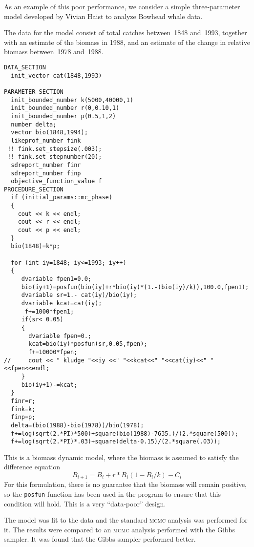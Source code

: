 \documentclass{admbmanual}
\begin{document}
As an example of this poor performance, we consider a simple three-parameter
model developed by Vivian Haist to analyze Bowhead whale data.

The data for the model consist of total catches between~1848 and~1993, together
with an estimate of the biomass in 1988, and an estimate of the change in
relative biomass between~1978 and~1988.

\begin{lstlisting}
DATA_SECTION
  init_vector cat(1848,1993)

PARAMETER_SECTION
  init_bounded_number k(5000,40000,1)
  init_bounded_number r(0,0.10,1)
  init_bounded_number p(0.5,1,2)
  number delta;
  vector bio(1848,1994);
  likeprof_number fink
 !! fink.set_stepsize(.003);
 !! fink.set_stepnumber(20);
  sdreport_number finr
  sdreport_number finp
  objective_function_value f
PROCEDURE_SECTION
  if (initial_params::mc_phase)
  {
    cout << k << endl;
    cout << r << endl;
    cout << p << endl;
  }
  bio(1848)=k*p;

  for (int iy=1848; iy<=1993; iy++)
  {
     dvariable fpen1=0.0;
     bio(iy+1)=posfun(bio(iy)+r*bio(iy)*(1.-(bio(iy)/k)),100.0,fpen1);
     dvariable sr=1.- cat(iy)/bio(iy);
     dvariable kcat=cat(iy);
      f+=1000*fpen1;
     if(sr< 0.05)
     {
       dvariable fpen=0.;
       kcat=bio(iy)*posfun(sr,0.05,fpen);
       f+=10000*fpen;
//     cout << " kludge "<<iy <<" "<<kcat<<" "<<cat(iy)<<" "<<fpen<<endl;
     }
     bio(iy+1)-=kcat;
  }
  finr=r;
  fink=k;
  finp=p;
  delta=(bio(1988)-bio(1978))/bio(1978);
  f+=log(sqrt(2.*PI)*500)+square(bio(1988)-7635.)/(2.*square(500));
  f+=log(sqrt(2.*PI)*.03)+square(delta-0.15)/(2.*square(.03));
\end{lstlisting}
This is a biomass dynamic model, where the biomass is assumed to satisfy the
difference equation
\begin{equation}
  B_{i+1}=B_i+r*B_i(1-B_i/k)-C_i
\end{equation}
For this formulation, there is no guarantee that the biomass will remain
positive, so the \texttt{posfun} function has been used in the program to ensure
that this condition will hold. This is a very ``data-poor'' design.

The model was fit to the data and the standard \textsc{mcmc} analysis was
performed for it. The results were compared to an \textsc{mcmc} analysis
performed with the Gibbs sampler. It was found that the Gibbs sampler performed
better.
\end{document}
